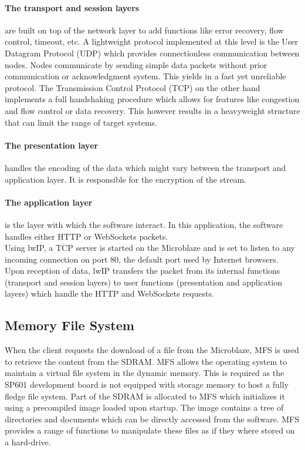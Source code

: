       \paragraph{The transport and session layers} are built on top of the network layer to add functions like error recovery, flow control, timeout, etc. A lightweight protocol implemented at this level is the User Datagram Protocol (UDP) which provides connectionless communication between nodes. Nodes communicate by sending simple data packets without prior communication or acknowledgment system. This yields in a fast yet unreliable protocol. The Transmission Control Protocol (TCP) on the other hand implements a full handshaking procedure which allows for features like congestion and flow control or data recovery. This however results in a heavyweight structure that can limit the range of target systems.

      \paragraph{The presentation layer} handles the encoding of the data which might vary between the transport and application layer. It is responsible for the encryption of the stream.

      \paragraph{The application layer} is the layer with which the software interact. In this application, the software handles either HTTP or WebSockets packets. \\

      Using lwIP, a TCP server is started on the Microblaze and is set to listen to any incoming connection on port 80, the default port used by Internet browsers. Upon reception of data, lwIP transfers the packet from its internal functions (transport and session layers) to user functions (presentation and application layers) which handle the HTTP and WebSockets requests.

    \subsection{Memory File System}

      When the client requests the download of a file from the Microblaze, MFS is used to retrieve the content from the SDRAM. MFS allows the operating system to maintain a virtual file system in the dynamic memory. This is required as the SP601 development board is not equipped with storage memory to host a fully fledge file system. Part of the SDRAM is allocated to MFS which initializes it using a precompiled image loaded upon startup. The image contains a tree of directories and documents which can be directly accessed from the software. MFS provides a range of functions to manipulate these files as if they where stored on a hard-drive.

